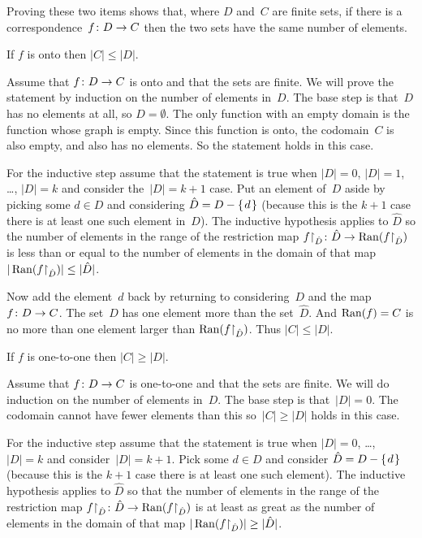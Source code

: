 \documentclass{test}  %
\begin{document}
\begin{problem}   \label{CorrespondingSetsHaveSameNumberOfElements}
  Proving these two items shows that, 
  where $D$ and~$C$ are finite sets, 
  if there is a correspondence~$\mbox{$f\colon D\to C$}$
  then the two sets have the same number of elements.
\begin{exes}
\begin{exercise}
  If $f$ is onto then $|C|\leq |D|$.
\end{exercise}
\begin{answer}
  Assume that $\mbox{$f\colon D\to C$}$ is onto and
  that the sets are finite.
  We will prove the statement by induction on the number of elements in~$D$.
  The base step is that~$D$ has no elements at all, so $D=\emptyset$.
  The only function with an empty domain is the function whose graph is 
  empty. 
  Since this function is onto, the codomain~$C$ is also empty, 
  and also has no elements.
  So the statement holds in this case.

  For the inductive step assume that the statement is true when $|D|=0$, 
  $|D|=1$, \ldots, $|D|=k$ and consider the~$|D|=k+1$ case.
  Put an element of~$D$ aside by picking some $d\in D$ and considering 
  $\hat{D}=D-\mbox{$\{\hspace{0.1em}d\hspace{0.1em}\}$}$ (because this is the $k+1$ case there is at least
  one such element in~$D$).
  The inductive hypothesis applies to $\hat{D}$ so the number of elements in
  the range of the restriction map 
  $\mbox{${f}\mathord\upharpoonright_{\hat{D}}\colon \hat{D}\to \operatorname{Ran}({f}\mathord\upharpoonright_{\hat{D}})$}$
  is less than or equal to the number of elements in the domain of that map
  $|\operatorname{Ran}({f}\mathord\upharpoonright_{\hat{D}})|\leq |\hat{D}|$.

  Now add the element~$d$ back by returning to considering~$D$ and the 
  map~$\mbox{$f\colon D\to C$}$.
  The set~$D$ has one element more than the set~$\hat{D}$.
  And $\operatorname{Ran}(f)=C$ is no more than one element larger than
  $\operatorname{Ran}({f}\mathord\upharpoonright_{\hat{D}})$.
  Thus $|C|\leq|D|$.  
\end{answer}
\begin{exercise} 
  If $f$ is one-to-one then $|C|\geq |D|$.
\end{exercise}
\begin{answer}
  Assume that $\mbox{$f\colon D\to C$}$ is one-to-one and
  that the sets are finite.
  We will do induction on the number of elements in~$D$.
  The base step is that~$|D|=0$.
  The codomain cannot have fewer elements than this
  so~$|C|\geq |D|$ holds in this case.

  For the inductive step assume that the statement is true when $|D|=0$, 
  \ldots, $|D|=k$ and consider~$|D|=k+1$.
  Pick some $d\in D$ and consider 
  $\hat{D}=D-\mbox{$\{\hspace{0.1em}d\hspace{0.1em}\}$}$ (because this is the $k+1$ case there is at least
  one such element).
  The inductive hypothesis applies to $\hat{D}$ so that 
  the number of elements in the range of the restriction map 
  $\mbox{${f}\mathord\upharpoonright_{\hat{D}}\colon \hat{D}\to \operatorname{Ran}({f}\mathord\upharpoonright_{\hat{D}})$}$
  is at least as great as the number of elements in the domain of that map
  $|\operatorname{Ran}({f}\mathord\upharpoonright_{\hat{D}})|\geq |\hat{D}|$.


\end{answer}
\end{exes}
\end{problem}
\end{document}
